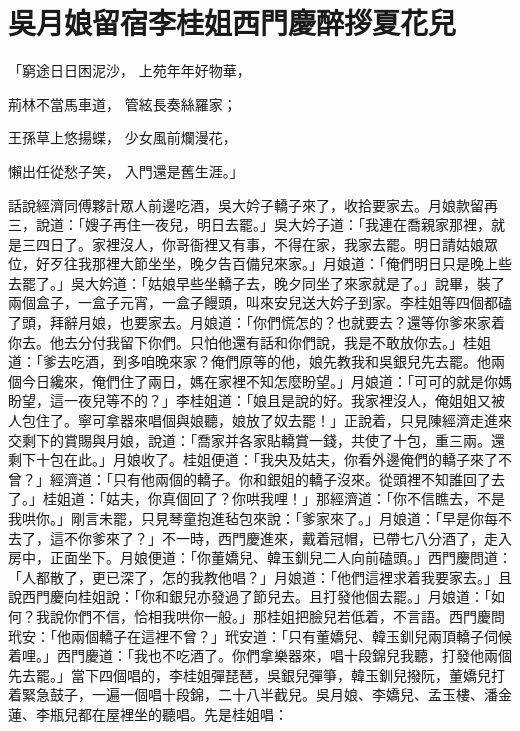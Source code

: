 %

\chapter{吳月娘留宿李桂姐\KG 西門慶醉拶夏花兒}


\begin{showcontents}{}



「窮途日日困泥沙，  上苑年年好物華，

荊林不當馬車道，  管絃長奏絲羅家；

王孫草上悠揚蝶，  少女風前爛漫花，

懶出任從愁子笑，  入門還是舊生涯。」

話說經濟同傅夥計眾人前邊吃酒，吳大妗子轎子來了，收拾要家去。月娘款留再三，說道：「嫂子再住一夜兒，明日去罷。」吳大妗子道：「我連在喬親家那裡，就是三四日了。家裡沒人，你哥衙裡又有事，不得在家，我家去罷。明日請姑娘眾位，好歹往我那裡大節坐坐，晚夕告百備兒來家。」月娘道：「俺們明日只是晚上些去罷了。」吳大妗道：「姑娘早些坐轎子去，晚夕同坐了來家就是了。」說畢，裝了兩個盒子，一盒子元宵，一盒子饅頭，叫來安兒送大妗子到家。李桂姐等四個都磕了頭，拜辭月娘，也要家去。月娘道：「你們慌怎的？也就要去？還等你爹來家着你去。他去分付我留下你們。只怕他還有話和你們說，我是不敢放你去。」桂姐道：「爹去吃酒，到多咱晚來家？俺們原等的他，娘先教我和吳銀兒先去罷。他兩個今日纔來，俺們住了兩日，媽在家裡不知怎麼盼望。」月娘道：「可可的就是你媽盼望，這一夜兒等不的？」李桂姐道：「娘且是說的好。我家裡沒人，俺姐姐又被人包住了。寧可拿器來唱個與娘聽，娘放了奴去罷！」正說着，只見陳經濟走進來交剩下的賞賜與月娘，說道：「喬家并各家貼轎賞一錢，共使了十包，重三兩。還剩下十包在此。」月娘收了。桂姐便道：「我央及姑夫，你看外邊俺們的轎子來了不曾？」經濟道：「只有他兩個的轎子。你和銀姐的轎子沒來。從頭裡不知誰回了去了。」桂姐道：「姑夫，你真個回了？你哄我哩！」那經濟道：「你不信瞧去，不是我哄你。」剛言未罷，只見琴童抱進毡包來說：「爹家來了。」月娘道：「早是你每不去了，這不你爹來了？」不一時，西門慶進來，戴着冠帽，已帶七八分酒了，走入房中，正面坐下。月娘便道：「你董嬌兒、韓玉釧兒二人向前磕頭。」西門慶問道：「人都散了，更已深了，怎的我教他唱？」月娘道：「他們這裡求着我要家去。」且說西門慶向桂姐說：「你和銀兒亦發過了節兒去。且打發他個去罷。」月娘道：「如何？我說你們不信，恰相我哄你一般。」那桂姐把臉兒若低着，不言語。西門慶問玳安：「他兩個轎子在這裡不曾？」玳安道：「只有董嬌兒、韓玉釧兒兩頂轎子伺候着哩。」西門慶道：「我也不吃酒了。你們拿樂器來，唱十段錦兒我聽，打發他兩個先去罷。」當下四個唱的，李桂姐彈琵琶，吳銀兒彈箏，韓玉釧兒撥阮，董嬌兒打着緊急鼓子，一遍一個唱十段錦，二十八半截兒。吳月娘、李嬌兒、孟玉樓、潘金蓮、李瓶兒都在屋裡坐的聽唱。先是桂姐唱：


\end{showcontents}
